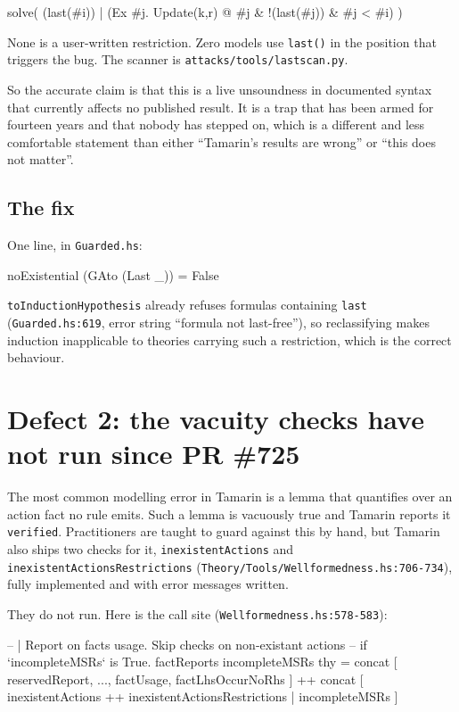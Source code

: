 \documentclass[version=preprint]{iacrcc}
\newcommand{\code}[1]{\texttt{\small #1}}
\theoremstyle{definition}
\theoremstyle{remark}
\begin{document}
	\begin{outlisting}
		solve( (last(#i)) | (Ex #j. Update(k,r) @ #j & !(last(#j)) & #j < #i) )
	\end{outlisting}

	None is a user-written restriction. Zero models use \code{last()} in the
	position that triggers the bug. The scanner is
	\code{attacks/tools/lastscan.py}.

	So the accurate claim is that this is a live unsoundness in documented syntax
	that currently affects no published result. It is a trap that has been armed
	for fourteen years and that nobody has stepped on, which is a different and
	less comfortable statement than either ``Tamarin's results are wrong'' or
	``this does not matter''.

	\subsection{The fix}

	One line, in \code{Guarded.hs}:

	\begin{hslisting}
		noExistential (GAto (Last _)) = False
	\end{hslisting}

	\code{toInductionHypothesis} already refuses formulas containing \code{last}
	(\code{Guarded.hs:619}, error string ``formula not last-free''), so
	reclassifying makes induction inapplicable to theories carrying such a
	restriction, which is the correct behaviour.

	\section{Defect 2: the vacuity checks have not run since PR \#725}\label{sec:vacuity}

	The most common modelling error in Tamarin is a lemma that quantifies over an
	action fact no rule emits. Such a lemma is vacuously true and Tamarin reports
	it \code{verified}. Practitioners are taught to guard against this by hand, but
	Tamarin also ships two checks for it, \code{inexistentActions} and
	\code{inexistentActionsRestrictions}
	(\code{Theory/Tools/Wellformedness.hs:706-734}), fully implemented and with
	error messages written.

	They do not run. Here is the call site
	(\code{Wellformedness.hs:578-583}):

	\begin{hslisting}
		-- | Report on facts usage. Skip checks on non-existant actions
		-- if `incompleteMSRs` is True.
		factReports incompleteMSRs thy =
		concat [ reservedReport, ..., factUsage, factLhsOccurNoRhs ]
		++ concat [ inexistentActions ++ inexistentActionsRestrictions
				| incompleteMSRs ]
	\end{hslisting}
\end{document}
